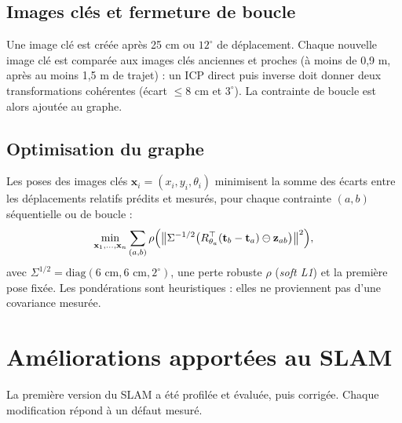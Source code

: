 \documentclass[11pt,a4paper]{article}
\begin{document}
\subsection{Images clés et fermeture de boucle}
Une image clé est créée après 25 cm ou $12^\circ$ de déplacement. Chaque
nouvelle image clé est comparée aux images clés anciennes et proches
(à moins de 0,9 m, après au moins 1,5 m de trajet) : un ICP direct puis
inverse doit donner deux transformations cohérentes (écart $\le 8$ cm et
$3^\circ$). La contrainte de boucle est alors ajoutée au graphe.

\subsection{Optimisation du graphe}
Les poses des images clés $\mathbf x_i=(x_i,y_i,\theta_i)$ minimisent la
somme des écarts entre les déplacements relatifs prédits et mesurés, pour
chaque contrainte $(a,b)$ séquentielle ou de boucle :
\[
 \min_{\mathbf x_1,\dots,\mathbf x_n}\sum_{(a,b)}
 \rho\Bigl(\bigl\|\Sigma^{-1/2}\bigl(R_{\theta_a}^{\top}(\mathbf t_b-\mathbf t_a)
 \ominus\mathbf z_{ab}\bigr)\bigr\|^2\Bigr),
\]
avec $\Sigma^{1/2}=\mathrm{diag}(6\text{ cm},6\text{ cm},2^\circ)$, une perte robuste
$\rho$ (\emph{soft L1}) et la première pose fixée. Les pondérations sont
heuristiques : elles ne proviennent pas d'une covariance mesurée.

\section{Améliorations apportées au SLAM}
La première version du SLAM a été profilée et évaluée, puis corrigée.
Chaque modification répond à un défaut mesuré.
\end{document}
